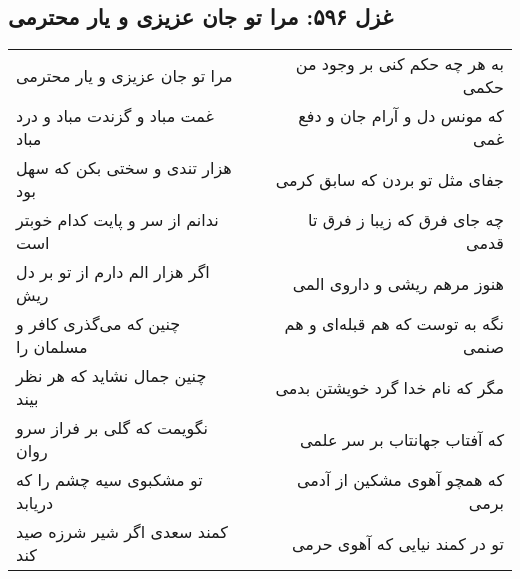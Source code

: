 \begin{center}
\section*{غزل ۵۹۶: مرا تو جان عزیزی و یار محترمی}
\label{sec:596}
\begin{longtable}{l p{0.5cm} r}
مرا تو جان عزیزی و یار محترمی
&&
به هر چه حکم کنی بر وجود من حکمی
\\
غمت مباد و گزندت مباد و درد مباد
&&
که مونس دل و آرام جان و دفع غمی
\\
هزار تندی و سختی بکن که سهل بود
&&
جفای مثل تو بردن که سابق کرمی
\\
ندانم از سر و پایت کدام خوبتر است
&&
چه جای فرق که زیبا ز فرق تا قدمی
\\
اگر هزار الم دارم از تو بر دل ریش
&&
هنوز مرهم ریشی و داروی المی
\\
چنین که می‌گذری کافر و مسلمان را
&&
نگه به توست که هم قبله‌ای و هم صنمی
\\
چنین جمال نشاید که هر نظر بیند
&&
مگر که نام خدا گرد خویشتن بدمی
\\
نگویمت که گلی بر فراز سرو روان
&&
که آفتاب جهانتاب بر سر علمی
\\
تو مشکبوی سیه چشم را که دریابد
&&
که همچو آهوی مشکین از آدمی برمی
\\
کمند سعدی اگر شیر شرزه صید کند
&&
تو در کمند نیایی که آهوی حرمی
\\
\end{longtable}
\end{center}
